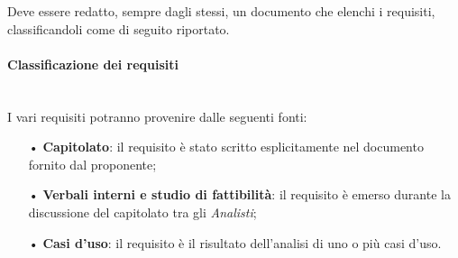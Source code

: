 Deve essere redatto, sempre dagli stessi, un documento che elenchi i requisiti, classificandoli come di seguito riportato.

\paragraph{Classificazione dei requisiti}\mbox{}\\
I vari requisiti potranno provenire dalle seguenti fonti:
\begin{itemize}
    \item[•] \textbf{Capitolato}: il requisito è stato scritto esplicitamente nel documento fornito dal proponente;
    \item[•] \textbf{Verbali interni e studio di fattibilità}: il requisito è emerso durante la discussione del capitolato tra gli \textit{Analisti};
    \item[•] \textbf{Casi d'uso}: il requisito è il risultato dell'analisi di uno o più casi d'uso.
\end{itemize}

